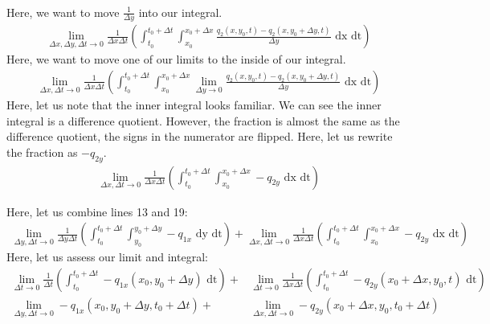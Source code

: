 \documentclass{article}
\begin{document}
\begin{enumerate}
\begin{enumerate}
\begin{enumerate}
\begin{align}
      \end{align}
      Here, we want to move $\frac{1}{\Delta y}$ into our integral.
      \begin{align}
        \lim_{\Delta x, \Delta y, \Delta t \to 0} \frac{1}{\Delta x \Delta t} \left(\int^{t_0 + \Delta t}_{t_0} \int^{x_0 + \Delta x}_{x_0} \frac{q_2(x, y_0, t) - q_2(x, y_0 + \Delta y, t)}{\Delta y} \text{ dx dt}\right)
      \end{align}
      Here, we want to move one of our limits to the inside of our integral.
      \begin{align}
        \lim_{\Delta x, \Delta t \to 0} \frac{1}{\Delta x \Delta t} \left(\int^{t_0 + \Delta t}_{t_0} \int^{x_0 + \Delta x}_{x_0}
        \lim_{\Delta y \to 0} \frac{q_2(x, y_0, t) - q_2(x, y_0 + \Delta y, t)}{\Delta y} \text{ dx dt}\right)
      \end{align}
      Here, let us note that the inner integral looks familiar. We can see the inner integral is a difference quotient. However, the fraction is almost the same as the difference quotient, the signs in the numerator are flipped. Here, let us rewrite the fraction as $-q_{2y}$.
      \begin{align}
        \lim_{\Delta x, \Delta t \to 0} \frac{1}{\Delta x \Delta t} \left(\int^{t_0 + \Delta t}_{t_0} \int^{x_0 + \Delta x}_{x_0}
        -q_{2y} \text{ dx dt}\right)
      \end{align}
    \end{enumerate}
    Here, let us combine lines 13 and 19:
    \begin{align}
      \lim_{\Delta y, \Delta t \to 0} \frac{1}{\Delta y \Delta t} \left(\int^{t_0 + \Delta t}_{t_0} \int^{y_0 + \Delta y}_{y_0}
      -q_{1x} \text{ dy dt}\right) +
      \lim_{\Delta x, \Delta t \to 0} \frac{1}{\Delta x \Delta t} \left(\int^{t_0 + \Delta t}_{t_0} \int^{x_0 + \Delta x}_{x_0}
      -q_{2y} \text{ dx dt}\right)
    \end{align}
    Here, let us assess our limit and integral:
    \begin{align}
      \lim_{\Delta t \to 0} \frac{1}{\Delta t} \left(\int^{t_0 + \Delta t}_{t_0}
      -q_{1x}(x_0, y_0 + \Delta y) \text{ dt}\right) + &
      \lim_{\Delta t \to 0} \frac{1}{\Delta x \Delta t} \left(\int^{t_0 + \Delta t}_{t_0}
      -q_{2y}(x_0 + \Delta x, y_0, t) \text{ dt}\right)\\
      \lim_{\Delta y, \Delta t \to 0}
      -q_{1x}(x_0, y_0 + \Delta y, t_0 + \Delta t) + &
      \lim_{\Delta x, \Delta t \to 0}
      -q_{2y}(x_0 + \Delta x, y_0, t_0 + \Delta t)
    \end{align}


\end{enumerate}
\end{enumerate}
\end{document}
